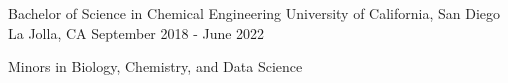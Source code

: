 \begin{cventries}

  \cventry
    {Bachelor of Science in Chemical Engineering} %
    {University of California, San Diego} %
    {La Jolla, CA} %
    {September 2018 - June 2022} %
    {
      \begin{cvitems} %
        \item {Minors in Biology, Chemistry, and Data Science}
      \end{cvitems}
    }
\end{cventries}